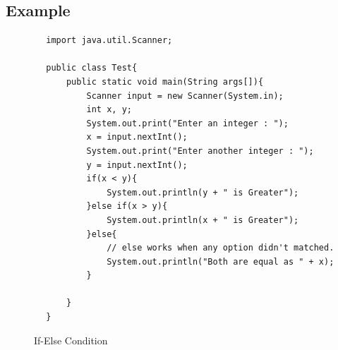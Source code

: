 \documentclass[openany]{book}  %
\begin{document}
\subsection{Example}
\begin{center}
    \begin{verbatim}
        import java.util.Scanner;

        public class Test{
            public static void main(String args[]){
                Scanner input = new Scanner(System.in);
                int x, y;
                System.out.print("Enter an integer : ");
                x = input.nextInt();
                System.out.print("Enter another integer : ");
                y = input.nextInt();
                if(x < y){
                    System.out.println(y + " is Greater");
                }else if(x > y){
                    System.out.println(x + " is Greater");
                }else{
                    // else works when any option didn't matched.
                    System.out.println("Both are equal as " + x);
                }

            }
        }
    \end{verbatim}
\end{center}
% 
% 
\begin{figure}[htbp]
    \begin{center}
        \caption{If-Else Condition}
    \end{center}
\end{figure}
% 
% 
\end{document}
